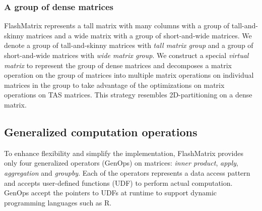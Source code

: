 \subsubsection{A group of dense matrices} \label{sec:mat_group}
FlashMatrix represents a tall matrix with many columns with a group of
tall-and-skinny matrices and a wide matrix with a group of short-and-wide
matrices. We denote a group of tall-and-skinny matrices with \textit{tall
matrix group} and a group of short-and-wide matrices with \textit{wide matrix
group}. We construct a special \textit{virtual matrix} to represent
the group of dense matrices and decomposes a matrix operation on the group of
matrices into multiple matrix operations on individual matrices in the group to
take advantage of the optimizations on matrix operations on TAS matrices.
This strategy resembles 2D-partitioning on a dense matrix.




\subsection{Generalized computation operations} \label{sec:genop}
To enhance flexibility and simplify the implementation, FlashMatrix provides
only four generalized operators (GenOps) on matrices: \textit{inner product},
\textit{apply}, \textit{aggregation} and \textit{groupby}. Each of the operators
represents a data access pattern and accepts user-defined functions (UDF) to
perform actual computation. GenOps accept the pointers to UDFs at runtime
to support dynamic programming languages such as R.

